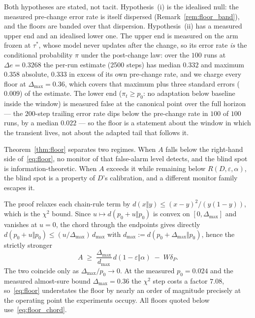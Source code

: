 Both hypotheses are stated, not tacit. Hypothesis~(i) is the idealised null:
the measured pre-change error rate is itself dispersed
(Remark~\ref{rem:floor_band}), and the floors are banded over that
dispersion. Hypothesis~(ii) has a measured upper end and an idealised lower
one. The upper end is measured on the arm frozen at $\tau^*$, whose model
never updates after the change, so its error rate \emph{is} the conditional
probability $\pi$ under the post-change law: over the $100$ runs at
$\Delta e = 0.3268$ the per-run estimate (2500 steps) has median $0.332$ and
maximum $0.358$ absolute, $0.333$ in excess of its own pre-change rate, and
we charge every floor at $\Delta_{\max} = 0.36$, which covers that maximum
plus three standard errors ($0.009$) of the estimate. The lower end
($\pi_t \ge p_0$: no adaptation below baseline inside the window) is
measured false at the canonical point over the full horizon --- the
$200$-step trailing error rate dips below the pre-change rate in $100$ of
$100$ runs, by a median $0.022$ --- so the floor is a statement about the
window in which the transient lives, not about the adapted tail that
follows it.

Theorem~\ref{thm:floor} separates two regimes. When $A$ falls below the
right-hand side of~\eqref{eq:floor}, no monitor of that false-alarm level
detects, and the blind spot is information-theoretic. When $A$ exceeds it
while remaining below $R(D,\varepsilon,\alpha)$, the blind spot is a property
of $D$'s calibration, and a different monitor family escapes it.

\begin{remark}\label{rem:floor_tight}
  The proof relaxes each chain-rule term by $d(x \Vert y) \le (x-y)^2/(y(1-y))$,
  which is the $\chi^2$ bound. Since $u \mapsto d(p_0 + u \Vert p_0)$ is convex
  on $[0, \Delta_{\max}]$ and vanishes at $u = 0$, the chord through the
  endpoints gives directly
  $d(p_0+u \Vert p_0) \le (u/\Delta_{\max})\, d_{\max}$ with
  $d_{\max} := d(p_0 + \Delta_{\max} \Vert p_0)$, hence the strictly stronger
  \begin{equation}\label{eq:floor_chord}
    A \;\ge\; \frac{\Delta_{\max}}{d_{\max}}\, d(1-\varepsilon \Vert \alpha)
              \;-\; W \delta_P .
  \end{equation}
  The two coincide only as $\Delta_{\max}/p_0 \to 0$. At the measured
  $p_0 = 0.024$ and the measured almost-sure bound
  $\Delta_{\max} = 0.36$ the $\chi^2$ step costs a
  factor $7.08$, so~\eqref{eq:floor} understates the floor by nearly an order
  of magnitude precisely at the operating point the experiments occupy. All
  floors quoted below use~\eqref{eq:floor_chord}.
\end{remark}

